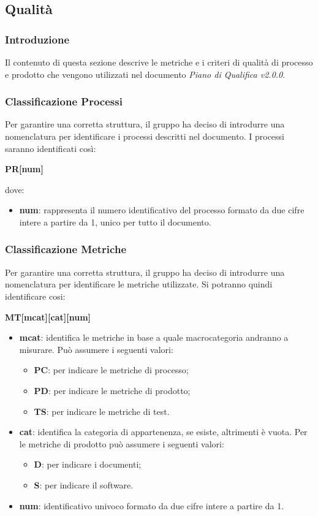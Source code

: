 \subsection{Qualità} \label{qualita}

\subsubsection{Introduzione}
Il contenuto di questa sezione descrive le metriche e i criteri di qualità di processo e prodotto che vengono utilizzati nel documento \textit{Piano di Qualifica v2.0.0}.

\subsubsection{Classificazione Processi}
Per garantire una corretta struttura, il gruppo ha deciso di introdurre una nomenclatura per identificare i processi descritti nel documento. I processi saranno identificati così:
\begin{center}
	\textbf{PR[num]}
\end{center}
dove:
\begin{itemize}
	\item \textbf{num}: rappresenta il numero identificativo del processo formato da due cifre intere a partire da 1, unico per tutto il documento.
\end{itemize}

\subsubsection{Classificazione Metriche}
Per garantire una corretta struttura, il gruppo ha deciso di introdurre una nomenclatura per identificare le metriche utilizzate. Si potranno quindi identificare cosi:
\begin{center}
	\textbf{MT[mcat][cat][num]}
\end{center}
\begin{itemize}
		\item \textbf{mcat}: identifica le metriche in base a quale macrocategoria andranno a misurare. Può assumere i seguenti valori:
	\begin{itemize}
		\item \textbf{PC}: per indicare le metriche di processo;
		\item \textbf{PD}: per indicare le metriche di prodotto;
		\item \textbf{TS}: per indicare le metriche di test.
	\end{itemize}
	\item \textbf{cat}: identifica la categoria di appartenenza, se esiste, altrimenti è vuota. Per le metriche di prodotto può assumere i seguenti valori:
	\begin{itemize}
		\item \textbf{D}: per indicare i documenti;
		\item \textbf{S}: per indicare il software.
	\end{itemize}

	\item \textbf{num}: identificativo univoco formato da due cifre intere a partire da 1.
\end{itemize}

